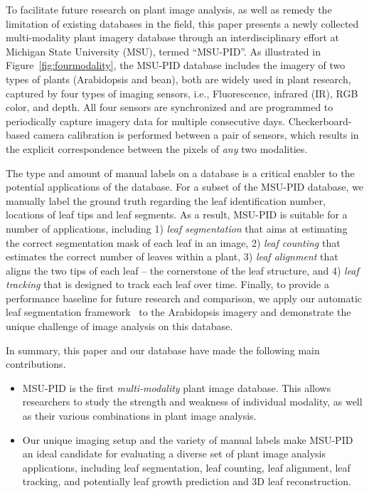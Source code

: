 To facilitate future research on plant image analysis, as well as remedy the limitation of existing databases in the field, this paper presents a newly collected multi-modality plant imagery database through an interdisciplinary effort at Michigan State University (MSU), termed ``MSU-PID''.
As illustrated in Figure~\ref{fig:fourmodality}, the MSU-PID database includes the imagery of two types of plants (Arabidopsis and bean), both are widely used in plant research, captured by four types of imaging sensors, i.e., Fluorescence, infrared (IR), RGB color, and depth.
All four sensors are synchronized and are programmed to periodically capture imagery data for multiple consecutive days.
Checkerboard-based camera calibration is performed between a pair of sensors, which results in the explicit correspondence between the pixels of {\it any} two modalities.

The type and amount of manual labels on a database is a critical enabler to the potential applications of the database.
For a subset of the MSU-PID database, we manually label the ground truth regarding the leaf identification number, locations of leaf tips and leaf segments.
As a result, MSU-PID is suitable for a number of applications, including 1) {\it leaf segmentation} that aims at estimating the correct segmentation mask of each leaf in an image, 2) {\it leaf counting} that estimates the correct number of leaves within a plant, 3) {\it leaf alignment} that aligns the two tips of each leaf -- the cornerstone of the leaf structure, and 4) {\it leaf tracking} that is designed to track each leaf over time.
Finally, to provide a performance baseline for future research and comparison, we apply our automatic leaf segmentation framework~\cite{yin2014a,yin2014b} to the Arabidopsis imagery and demonstrate the unique challenge of image analysis on this database.

In summary, this paper and our database have made the following main contributions.
\begin{itemize}
\item MSU-PID is the first {\it multi-modality} plant image database. This allows researchers to study the strength and weakness of individual modality, as well as their various combinations in plant image analysis.
\item Our unique imaging setup and the variety of manual labels make MSU-PID an ideal candidate for evaluating a diverse set of plant image analysis applications, including leaf segmentation, leaf counting, leaf alignment, leaf tracking, and potentially leaf growth prediction and $3$D leaf reconstruction.
\end{itemize}










